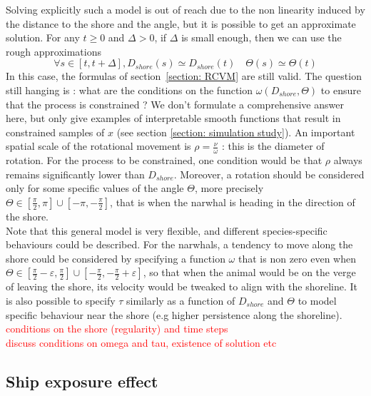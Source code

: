 \documentclass[11pt]{article}
\newcommand {\1}{\mathbb{1}}
\begin{document}
 Solving explicitly such a model is out of reach due to the non linearity induced by the distance to the shore and the angle, but it is possible to get an approximate solution.
 For any $t \geq 0$ and $\Delta>0$, if $\Delta$ is small enough, then we can use the rough approximations
 \[\forall s \in [t,t+\Delta], D_{shore}(s) \simeq D_{shore}(t) \quad \Theta(s)\simeq \Theta(t)\]
 In this case, the formulas of section~\ref{section: RCVM} are still valid.
 The question still hanging is : what are the conditions on the function $\omega(D_{shore},\Theta)$ to ensure that the process is constrained ?
 We don't formulate a comprehensive answer here, but only give examples of interpretable smooth functions that result in constrained samples of $x$ (see section \ref{section: simulation study}).
 An important spatial scale of the rotational movement is $\rho=\frac{\nu}{\omega}$ : this is the diameter of rotation. For the process to be constrained, one condition would be that $\rho$ always remains significantly lower than $D_{shore}$. Moreover, a rotation should be considered only for some specific values of the angle $\Theta$, more precisely $\Theta \in \left[\frac{\pi}{2},\pi\right] \cup \left[-\pi,-\frac{\pi}{2}\right]$, that is when the narwhal is heading in the direction of the shore.\\ 
 
 Note that this general model is very flexible, and different species-specific behaviours could be described. For the narwhals, a tendency to move along the shore could be considered by specifying a function $\omega$ that is non zero even when $\Theta \in \left[\frac{\pi}{2}-\varepsilon,\frac{\pi}{2}\right] \cup \left[-\frac{\pi}{2},-\frac{\pi}{2}+\varepsilon\right]$, so that when the animal would be on the verge of leaving the shore, its velocity would be tweaked to align with the shoreline. It is also possible  to specify $\tau$ similarly as a function of $D_{shore}$ and $\Theta$ to model specific behaviour near the shore (e.g higher persistence along the shoreline).\\
 
\textcolor{red}{
	conditions on the shore (regularity) and time steps\\
 	discuss conditions on omega and tau, existence of solution etc
 }

\subsection{Ship exposure effect}
\label{subsection: ship exposure effect}
\end{document}
